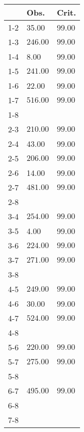 \begin{table}[ht]
\centering
\begin{tabular}{rll}
  \hline
 & Obs. & Crit. \\ 
  \hline
1-2 & 35.00 & 99.00 \\ 
  1-3 & \(\mathbf{246.00}\) & \(\mathbf{99.00}\) \\ 
  1-4 & 8.00 & 99.00 \\ 
  1-5 & \(\mathbf{241.00}\) & \(\mathbf{99.00}\) \\ 
  1-6 & 22.00 & 99.00 \\ 
  1-7 & \(\mathbf{516.00}\) & \(\mathbf{99.00}\) \\ 
  1-8 &  &  \\ 
  2-3 & \(\mathbf{210.00}\) & \(\mathbf{99.00}\) \\ 
  2-4 & 43.00 & 99.00 \\ 
  2-5 & \(\mathbf{206.00}\) & \(\mathbf{99.00}\) \\ 
  2-6 & 14.00 & 99.00 \\ 
  2-7 & \(\mathbf{481.00}\) & \(\mathbf{99.00}\) \\ 
  2-8 &  &  \\ 
  3-4 & \(\mathbf{254.00}\) & \(\mathbf{99.00}\) \\ 
  3-5 & 4.00 & 99.00 \\ 
  3-6 & \(\mathbf{224.00}\) & \(\mathbf{99.00}\) \\ 
  3-7 & \(\mathbf{271.00}\) & \(\mathbf{99.00}\) \\ 
  3-8 &  &  \\ 
  4-5 & \(\mathbf{249.00}\) & \(\mathbf{99.00}\) \\ 
  4-6 & 30.00 & 99.00 \\ 
  4-7 & \(\mathbf{524.00}\) & \(\mathbf{99.00}\) \\ 
  4-8 &  &  \\ 
  5-6 & \(\mathbf{220.00}\) & \(\mathbf{99.00}\) \\ 
  5-7 & \(\mathbf{275.00}\) & \(\mathbf{99.00}\) \\ 
  5-8 &  &  \\ 
  6-7 & \(\mathbf{495.00}\) & \(\mathbf{99.00}\) \\ 
  6-8 &  &  \\ 
  7-8 &  &  \\ 
   \hline
\end{tabular}
\end{table}
